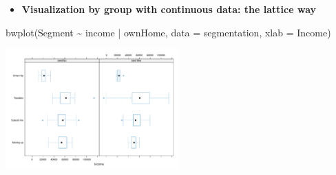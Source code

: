 \documentclass[
  ignorenonframetext,
]{beamer}
\newenvironment{Shaded}{\begin{snugshade}}{\end{snugshade}}
\newcommand{\AttributeTok}[1]{\textcolor[rgb]{0.40,0.45,0.13}{#1}}
\newcommand{\FunctionTok}[1]{\textcolor[rgb]{0.28,0.35,0.67}{#1}}
\newcommand{\NormalTok}[1]{\textcolor[rgb]{0.00,0.23,0.31}{#1}}
\newcommand{\SpecialCharTok}[1]{\textcolor[rgb]{0.37,0.37,0.37}{#1}}
\newcommand{\StringTok}[1]{\textcolor[rgb]{0.13,0.47,0.30}{#1}}
\providecommand{\tightlist}{%
  \setlength{\itemsep}{0pt}\setlength{\parskip}{0pt}}\usepackage{longtable,booktabs,array}
\begin{document}
\begin{frame}[fragile]{}
\label{section-19}
\begin{itemize}
\tightlist
\item
  \textbf{Visualization by group with continuous data: the lattice way}
\end{itemize}

\tiny

\begin{Shaded}
\begin{Highlighting}[]
\FunctionTok{bwplot}\NormalTok{(Segment }\SpecialCharTok{\textasciitilde{}}\NormalTok{ income }\SpecialCharTok{|}\NormalTok{ ownHome,}
       \AttributeTok{data =}\NormalTok{ segmentation,}
       \AttributeTok{xlab =} \StringTok{\textquotesingle{}Income\textquotesingle{}}\NormalTok{)}
\end{Highlighting}
\end{Shaded}

\begin{center}
\includegraphics[width=0.5\textwidth,height=\textheight]{005_comparing_groups_tables_and_visualizations_files/figure-beamer/unnamed-chunk-21-1.pdf}
\end{center}
\end{frame}
\end{document}

